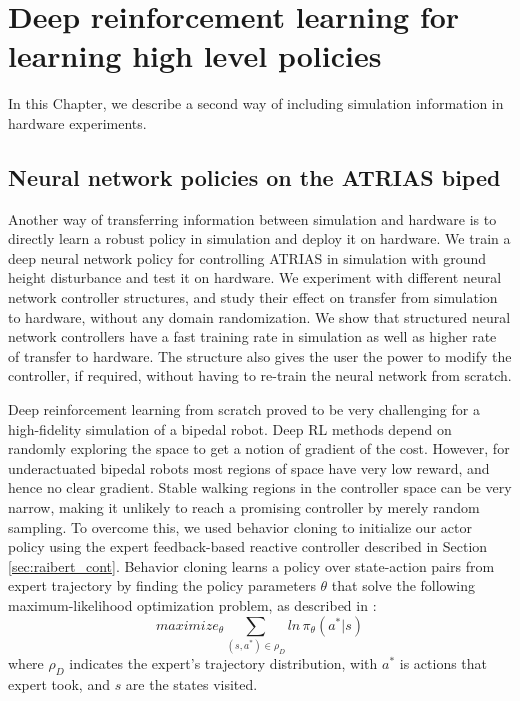 \chapter{Deep reinforcement learning for learning high level policies}

\label{chap:deep}

In this Chapter, we describe a second way of including simulation information in hardware experiments.

\section{Neural network policies on the ATRIAS biped}

Another way of transferring information between simulation and hardware is to directly learn a robust policy in simulation and deploy it on hardware. We train a deep neural network policy for controlling ATRIAS in simulation with ground height disturbance and test it on hardware. We experiment with different neural network controller structures, and study their effect on transfer from simulation to hardware, without any domain randomization. We show that structured neural network controllers have a fast training rate in simulation as well as higher rate of transfer to hardware. The structure also gives the user the power to modify the controller, if required, without having to re-train the neural network from scratch.

Deep reinforcement learning from scratch proved to be very challenging for a high-fidelity simulation of a bipedal robot. Deep RL methods depend on randomly exploring the space to get a notion of gradient of the cost. However, for underactuated bipedal robots most regions of space have very low reward, and hence no clear gradient. Stable walking regions in the controller space can be very narrow, making it unlikely to reach a promising controller by merely random sampling. To overcome this, we used behavior cloning to initialize our actor policy using the expert feedback-based reactive controller described in Section \ref{sec:raibert_cont}. Behavior cloning learns a policy over state-action pairs from expert trajectory by finding the policy parameters $\theta$ that solve the following maximum-likelihood optimization problem, as described in  \cite{rajeswaran2017learning}: 
\begin{equation}
    maximize_\theta \sum_{(s,a^*) \in \rho_D} ln \, \pi_\theta (a^*|s)
\end{equation}
where $\rho_D$ indicates the expert's trajectory distribution, with  $a^*$ is actions that expert took, and $s$ are the states visited.

